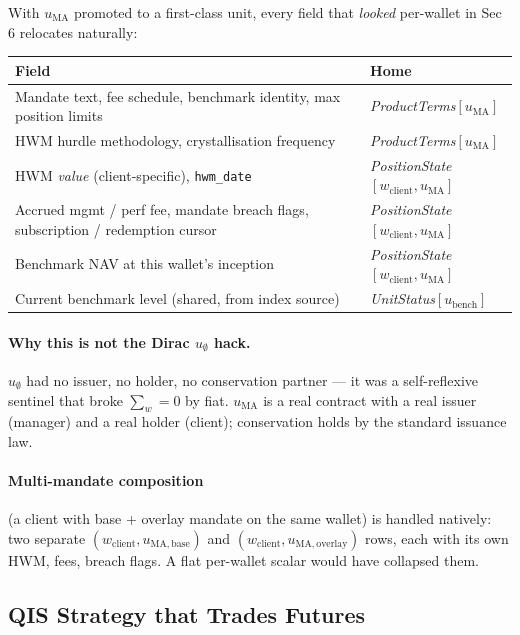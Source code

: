 \documentclass[11pt,a4paper]{article}
\begin{document}
\noindent With $u_{\mathrm{MA}}$ promoted to a first-class unit, every field that \emph{looked} per-wallet in Sec 6 relocates naturally:

\begin{longtable}{p{8.5cm}p{6.5cm}}
\toprule
\textbf{Field} & \textbf{Home} \\
\midrule
Mandate text, fee schedule, benchmark identity, max position limits & \textit{ProductTerms}$[u_{\mathrm{MA}}]$ \\
HWM hurdle methodology, crystallisation frequency & \textit{ProductTerms}$[u_{\mathrm{MA}}]$ \\
HWM \emph{value} (client-specific), \texttt{hwm\_date} & \textit{PositionState}$[w_{\mathrm{client}}, u_{\mathrm{MA}}]$ \\
Accrued mgmt / perf fee, mandate breach flags, subscription / redemption cursor & \textit{PositionState}$[w_{\mathrm{client}}, u_{\mathrm{MA}}]$ \\
Benchmark NAV at this wallet's inception & \textit{PositionState}$[w_{\mathrm{client}}, u_{\mathrm{MA}}]$ \\
Current benchmark level (shared, from index source) & \textit{UnitStatus}$[u_{\mathrm{bench}}]$ \\
\bottomrule
\end{longtable}

\paragraph{Why this is not the Dirac $u_\emptyset$ hack.} $u_\emptyset$ had no issuer, no holder, no conservation partner --- it was a self-reflexive sentinel that broke $\sum_w = 0$ by fiat. $u_{\mathrm{MA}}$ is a real contract with a real issuer (manager) and a real holder (client); conservation holds by the standard issuance law.

\paragraph{Multi-mandate composition} (a client with base + overlay mandate on the same wallet) is handled natively: two separate $(w_{\mathrm{client}}, u_{\mathrm{MA,base}})$ and $(w_{\mathrm{client}}, u_{\mathrm{MA,overlay}})$ rows, each with its own HWM, fees, breach flags. A flat per-wallet scalar would have collapsed them.

\subsection{QIS Strategy that Trades Futures}
\end{document}
